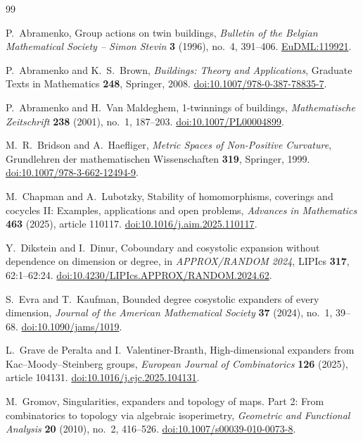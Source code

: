 \begin{thebibliography}{99}
\small

P.~Abramenko,
Group actions on twin buildings,
\emph{Bulletin of the Belgian Mathematical Society -- Simon Stevin}
\textbf{3} (1996), no.~4, 391--406.
\href{https://eudml.org/doc/119921}{EuDML:119921}.

P.~Abramenko and K.~S.~Brown,
\emph{Buildings: Theory and Applications},
Graduate Texts in Mathematics \textbf{248}, Springer, 2008.
\href{https://doi.org/10.1007/978-0-387-78835-7}{doi:10.1007/978-0-387-78835-7}.

P.~Abramenko and H.~Van Maldeghem,
1-twinnings of buildings,
\emph{Mathematische Zeitschrift} \textbf{238} (2001), no.~1, 187--203.
\href{https://doi.org/10.1007/PL00004899}{doi:10.1007/PL00004899}.

M.~R.~Bridson and A.~Haefliger,
\emph{Metric Spaces of Non-Positive Curvature},
Grundlehren der mathematischen Wissenschaften \textbf{319}, Springer, 1999.
\href{https://doi.org/10.1007/978-3-662-12494-9}{doi:10.1007/978-3-662-12494-9}.

M.~Chapman and A.~Lubotzky,
Stability of homomorphisms, coverings and cocycles II: Examples,
applications and open problems,
\emph{Advances in Mathematics} \textbf{463} (2025), article 110117.
\href{https://doi.org/10.1016/j.aim.2025.110117}{doi:10.1016/j.aim.2025.110117}.

Y.~Dikstein and I.~Dinur,
Coboundary and cosystolic expansion without dependence on dimension or degree,
in \emph{APPROX/RANDOM 2024}, LIPIcs \textbf{317}, 62:1--62:24.
\href{https://doi.org/10.4230/LIPIcs.APPROX/RANDOM.2024.62}{doi:10.4230/LIPIcs.\allowbreak APPROX/RANDOM.2024.62}.

S.~Evra and T.~Kaufman,
Bounded degree cosystolic expanders of every dimension,
\emph{Journal of the American Mathematical Society}
\textbf{37} (2024), no.~1, 39--68.
\href{https://doi.org/10.1090/jams/1019}{doi:10.1090/jams/1019}.

L.~Grave de Peralta and I.~Valentiner-Branth,
High-dimensional expanders from Kac--Moody--Steinberg groups,
\emph{European Journal of Combinatorics} \textbf{126} (2025), article 104131.
\href{https://doi.org/10.1016/j.ejc.2025.104131}{doi:10.1016/j.ejc.2025.104131}.

M.~Gromov,
Singularities, expanders and topology of maps. Part 2: From combinatorics
to topology via algebraic isoperimetry,
\emph{Geometric and Functional Analysis} \textbf{20} (2010), no.~2, 416--526.
\href{https://doi.org/10.1007/s00039-010-0073-8}{doi:10.1007/s00039-010-0073-8}.


\end{thebibliography}
